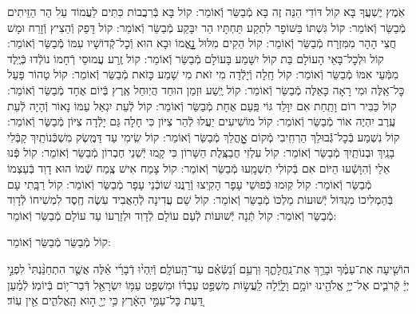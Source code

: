 \documentclass[twoside, openany, parskip=half, 11pt]{book}
\begin{document}
\begin{small}
	אֹֽמֶץ יֶשְׁעֲךָ בָּא קוֹל דּוֹדִי הִנֵּה זֶה בָּא מְֿבַשֵּׂר וְֿאוֹמֵר:
	קוֹל בָּא בְּֿרִבֲבוֹת כִּתִּים לַעֲמוֹד עַל הַר הַזֵּיתִים מְֿבַשֵּׂר וְֿאוֹמֵר:
	קוֹל גִּשְׁתּוֹ בַּשּׁוֹפָר לִתְקַע תַּחְתָּיו הַר יִבָּקַע מְֿבַשֵּׂר וְֿאוֹמֵר:
	קוֹל דָּפַק וְֿהֵצִיץ וְֿזָרַח וּמָשׁ חֲצִי הָהָר מִמִּזְרָח מְֿבַשֵּׂר וְֿאוֹמֵר:
	קוֹל הֵקִים מִלּוּל נׇׇׇׇׇׇָאֳמוֹ וּבָא הוּא וְֿכׇל־קְֿדוֹשָׁיו עִמּוֹ מְֿבַשֵּׂר וְֿאוֹמֵר:
	קוֹל וּלְכׇל־בָּאֵי הָעוֹלָם בַּת קוֹל יִשָּׁמַע בָּעוֹלָם מְֿבַשֵּׂר וְֿאוֹמֵר:
	קוֹל זֶֽרַע עֲמוּסֵי רְֿחָמוֹ נוֹלְֿדוּ כְּֿיֶֽלֶד מִמְּֿעֵי אִמּוֹ מְֿבַשֵּׂר וְֿאוֹמֵר:
	קוֹל חָֽלָה וְֿיָלְֿדָה מִי זֹאת מִי שָׁמַע כָּזֹאת מְֿבַשֵּׂר וְֿאוֹמֵר:
	קוֹל טָהוֹר פָּעַל כׇּל־אֵֽלֶּה וּמִי רָאָה כָּאֵלֶּה מְֿבַשֵּׂר וְֿאוֹמֵר:
	קוֹל יֶֽשַׁע וּזְמַן הוּחַד הֲיֽוּחַל אֶֽרֶץ בְּֿיוֹם אֶחָד מְֿבַשֵּׂר וְֿאוֹמֵר:
	קוֹל כַּבִּיר רוֹם וָתַֽחַת אִם יִוָּלֵד גּוֹי פַּֽעַם אֶחָת מְֿבַשֵּׂר וְֿאוֹמֵר:
	קוֹל לְֿעֵת יִגְאַל עַמּוֹ נָאוֹר וְֿהָיָה לְֿעֵת עֶֽרֶב יִהְיֶה אוֹר מְֿבַשֵּׂר וְֿאוֹמֵר:
	קוֹל מוֹשִׁיעִים יַעֲלוּ לְֿהַר צִיּוֹן כִּי חָלָה גַּם יָלְֿדָה צִיּוֹן מְֿבַשֵּׂר וְֿאוֹמֵר:
	קוֹל נִשְׁמַע בְּֿכׇל־גְּֿֿבוּלֵךְ הַרְחִֽיבִי מְֿקוֹם אׇׇׇׇׇׇׇׇׇׇָהֳלֵךְ מְֿבַשֵּׂר וְֿאוֹמֵר:
	קוֹל שִֽׂימִי עַד דַּמֶּֽשֶׂק מִשְׁכְּֿנוֹתַֽיִךְ קַבְּֿלִי בָנַֽיִךְ וּבְנוֹתַֽיִךְ מְֿבַשֵּׂר וְֿאוֹמֵר:
	קוֹל עִלְזִי חֲבַצֶּֽלֶת הַשָּׁרוֹן כִּי קָֽמוּ יְֿשֵׁנֵי חֶבְרוֹן מְֿבַשֵּׂר וְֿאוֹמֵר:
	קוֹל פְּֿנוּ אֵלַי וְֿהִוָּשְֿׁעוּ הַיּוֹם אִם בְּֿקוֹלִי תִשְׁמָֽעוּ מְֿבַשֵּׂר וְֿאוֹמֵר:
	קוֹל צָמַח אִישׁ צֶֽמַח שְֿׁמוֹ הוּא דָוִד בְּֿעַצְמוֹ מְֿבַשֵּׂר וְֿאוֹמֵר:
	קוֹל קֽוּמוּ כְּֿפוּשֵׁי עָפָר הָקִֽיצוּ וְֿרַנֲּנוּ שׁוֹכְֿנֵי עָפָר מְֿבַשֵּׂר וְֿאוֹמֵר:
	קוֹל רַבָּֽתִי עָם בְּֿהַמְלִיכוֹ מִגְדּוֹל יְֿשׁוּעוֹת מַלְכּוֹ מְֿבַשֵּׂר וְֿאוֹמֵר:
	קוֹל שֵׁם עֲדִינָה לְֿהַאֲבִיד עֹֽשֶׂה חֶֽסֶד לִמְשִׁיחוֹ לְֿדָוִד מְֿבַשֵּׂר וְֿאוֹמֵר:
	קוֹל תְּֿנָה יְֿשׁוּעוֹת לְֿעַם עוֹלָם לְֿדָוִד וּלְזַרְעוֹ עַד עוֹלָם מְֿבַשֵּׂר וְֿאוֹמֵר:
	
\end{small}

\begin{large}
	קוֹל מְֿבַשֵּׂר מְֿבַשֵּׂר וְֿאוֹמֵר:
	
\end{large}

הוֹשִׁ֤יעָה אֶת־עַמֶּ֗ךָ וּבָרֵ֥ךְ אֶת־נַֽחֲלָתֶ֑ךָ וּֽרְעֵ֥ם וְֿ֝נַשְּֿׂאֵ֗ם עַד־הָֽעוֹלָֽם׃ וְֿיִֽהְי֨וּ דְֿבָרַ֜י אֵ֗לֶּה אֲשֶׁ֤ר הִתְחַנַּ֨נְתִּי֙ לִפְנֵ֣י יְיָ֔ קְֿרֹבִ֛ים אֶל־יְיָ֥ אֱלֹהֵ֖ינוּ יוֹמָ֣ם וָלָ֑יְֿלָה לַֽעֲשׂ֣וֹת מִשְׁפַּ֣ט עַבְדּ֗וֹ וּמִשְׁפַּ֛ט עַמּ֥וֹ יִשְׂרָאֵ֖ל דְּֿבַר־י֥וֹם בְּֿיוֹמֽוֹ׃ לְֿמַ֗עַן דַּ֚עַת כׇּל־עַמֵּ֣י הָאָ֔רֶץ כִּ֥י יְיָ֖ ה֣וּא הָֽאֱלֹהִ֑ים אֵ֖ין עֽוֹד׃

\end{document}
